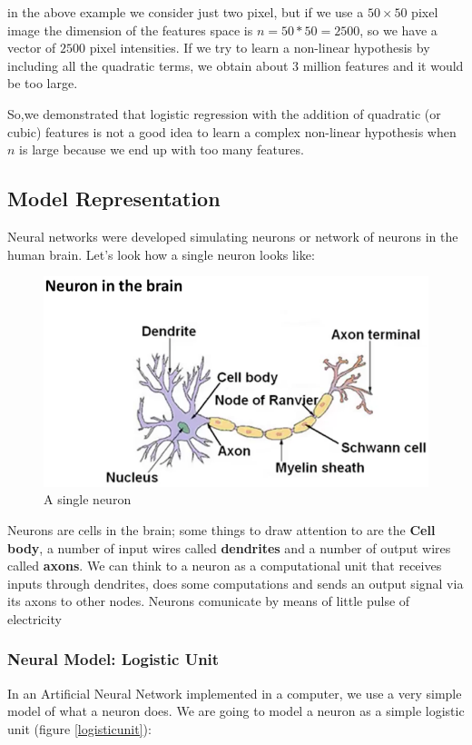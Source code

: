 in the above example we consider just two pixel, but if we use a $50 \times 50$ pixel image the dimension of the features space is $n = 50*50 = 2500$, so we have a vector of $2500$ pixel intensities. If we try to learn a non-linear hypothesis by including all the quadratic terms, we obtain about $3$ million features and it would be too large.

So,we demonstrated that logistic regression with the addition of quadratic (or cubic) features is not a good idea to learn a complex non-linear hypothesis when $n$ is large because we end up with too many features.


\subsection{Model Representation}
Neural networks were developed simulating neurons or network of neurons in the human brain. Let's look how a single neuron looks like:

\begin{figure}[H]
\begin{center}
\includegraphics[scale=0.25]{images/neuron}
\end{center}
\caption{A single neuron} 
\label{neuron}
\end{figure}


Neurons are cells in the brain; some things to draw attention to are the {\bf Cell body}, a number of input wires called {\bf dendrites} and a number of output wires called {\bf axons}. We can think to a neuron as a computational unit that receives inputs through dendrites, does some computations and sends an output signal via its axons to other nodes. Neurons comunicate by means of little pulse of electricity 


\subsubsection{Neural Model: Logistic Unit}
In an {Artificial Neural Network} implemented in a computer, we use a very simple model of what a neuron does. We are going to model a neuron as a simple logistic unit (figure \ref{logisticunit}):



